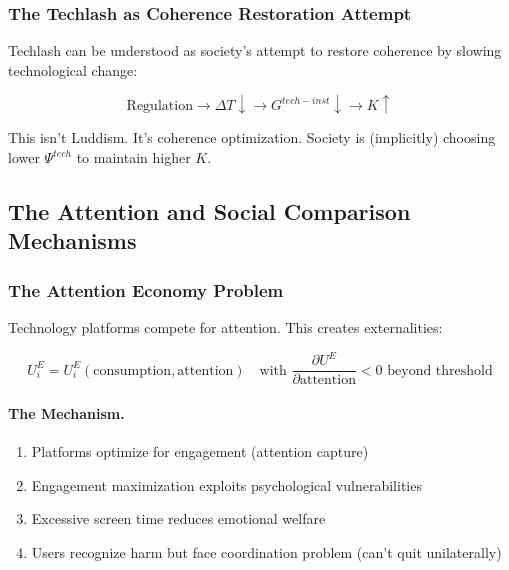 \subsubsection{The Techlash as Coherence Restoration Attempt}

Techlash can be understood as society's attempt to restore coherence by 
slowing technological change:

\begin{equation}
\text{Regulation} \to \Delta T \downarrow \to G^{tech-inst} \downarrow \to K \uparrow
\end{equation}

This isn't Luddism. It's coherence optimization. Society is (implicitly) 
choosing lower $\Psi^{tech}$ to maintain higher $K$.

\subsection{The Attention and Social Comparison Mechanisms}

\subsubsection{The Attention Economy Problem}

Technology platforms compete for attention. This creates externalities:

\begin{equation}
U^E_i = U^E_i(\text{consumption}, \text{attention}) \quad \text{with } \frac{\partial U^E}{\partial \text{attention}} < 0 \text{ beyond threshold}
\end{equation}

\paragraph{The Mechanism.}
\begin{enumerate}
    \item Platforms optimize for engagement (attention capture)
    \item Engagement maximization exploits psychological vulnerabilities
    \item Excessive screen time reduces emotional welfare
    \item Users recognize harm but face coordination problem (can't quit unilaterally)
\end{enumerate}


